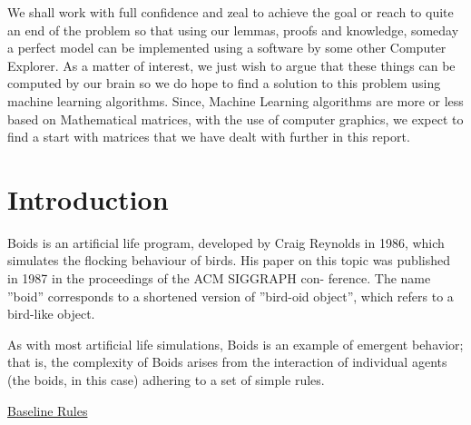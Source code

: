 \documentclass[12pt]{report}
\begin{document}
\vspace{0.2cm}
We shall work with full confidence and zeal to achieve the goal or reach to quite an end of the problem so that using our lemmas, proofs and knowledge, someday a perfect model can be implemented using a software by some other Computer Explorer. As a matter of interest, we just wish to argue that these things can be computed by our brain so we do hope to find a solution to this problem using machine learning algorithms. Since, Machine Learning algorithms are more or less based on Mathematical matrices, with the use of computer graphics, we expect to find a start with matrices that we have dealt with further in this report. 

\newpage

\tableofcontents

\newpage


\chapter{Introduction}

Boids is an artificial life program, developed by Craig Reynolds in 1986,
which simulates the flocking behaviour of birds. His paper on this topic
was published in 1987 in the proceedings of the ACM SIGGRAPH con-
ference. The name ”boid” corresponds to a shortened version of ”bird-oid
object”, which refers to a bird-like object.

\vspace{1cm}
As with most artificial life simulations, Boids is an example of emergent
behavior; that is, the complexity of Boids arises from the interaction of individual agents (the boids, in this case) adhering to a set of simple rules.

\hyperref[sec:baseline]{Baseline Rules}

\vspace{0.5cm}
\end{document}
